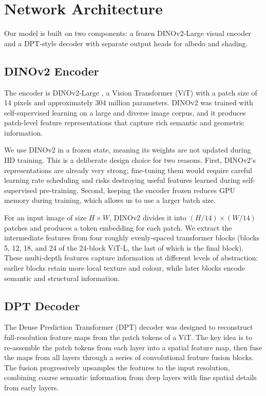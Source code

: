 


\section{Network Architecture}
\label{sec:architecture}

Our model is built on two components: a frozen DINOv2-Large visual encoder and a
DPT-style decoder with separate output heads for albedo and shading.

\subsection{DINOv2 Encoder}

The encoder is DINOv2-Large , a Vision Transformer (ViT)
with a patch size of 14 pixels and approximately 304 million parameters.
DINOv2 was trained with self-supervised learning on a large and diverse image
corpus, and it produces patch-level feature representations that capture
rich semantic and geometric information.

We use DINOv2 in a frozen state, meaning its weights are not updated during
IID training.
This is a deliberate design choice for two reasons.
First, DINOv2's representations are already very strong; fine-tuning them would
require careful learning rate scheduling and risks destroying useful features
learned during self-supervised pre-training.
Second, keeping the encoder frozen reduces GPU memory during training, which
allows us to use a larger batch size.

For an input image of size $H \times W$, DINOv2 divides it into $(H/14) \times (W/14)$
patches and produces a token embedding for each patch.
We extract the intermediate features from four roughly evenly-spaced transformer
blocks (blocks 5, 12, 18, and 24 of the 24-block ViT-L, the last of which is the
final block).
These multi-depth features capture information at different levels of abstraction:
earlier blocks retain more local texture and colour, while later blocks encode
semantic and structural information.

\subsection{DPT Decoder}

The Dense Prediction Transformer (DPT) decoder  was designed
to reconstruct full-resolution feature maps from the patch tokens of a ViT.
The key idea is to re-assemble the patch tokens from each layer into a spatial
feature map, then fuse the maps from all layers through a series of convolutional
feature fusion blocks.
The fusion progressively upsamples the features to the input resolution,
combining coarse semantic information from deep layers with fine spatial details
from early layers.

